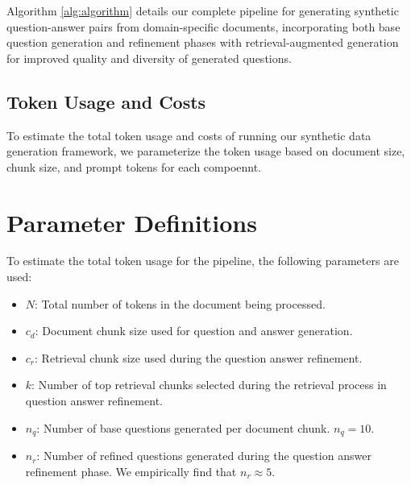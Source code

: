 Algorithm \ref{alg:algorithm} details our complete pipeline for generating
synthetic question-answer pairs from domain-specific documents, incorporating
both base question generation and refinement phases with retrieval-augmented
generation for improved quality and diversity of generated questions.


\subsection{Token Usage and Costs}

To estimate the total token usage and costs of running our synthetic data generation framework,
we parameterize the token usage based on document size, chunk size, and prompt tokens for each compoennt.

\section*{Parameter Definitions}

To estimate the total token usage for the pipeline, the following parameters are used:

\begin{itemize}
    \item \( N \): Total number of tokens in the document being processed.
    \item \( c_d \): Document chunk size used for question and answer generation.
    \item \( c_r \): Retrieval chunk size used during the question answer refinement.
    \item \( k \): Number of top retrieval chunks selected during the retrieval process in question answer refinement.
    \item \( n_q \): Number of base questions generated per document chunk. \( n_q = 10 \).
    \item \( n_r \): Number of refined questions generated during the question answer refinement phase. We empirically find that  \( n_r  \approx  5 \).

\end{itemize}

